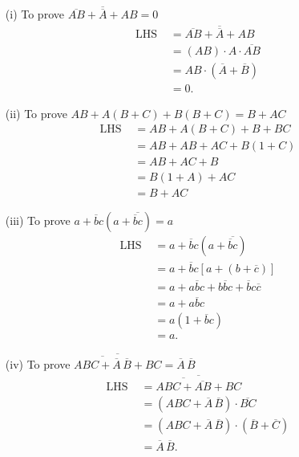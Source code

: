 \begin{solution}
\begin{itemize}
\item[(i)] To prove $\overline{\overline{AB}+\overline{A}+AB}=0$
\begin{align*}
\text{LHS } &= \overline{\overline{AB}+\overline{A}+AB}\\[3pt]
            &= (AB)\cdot A\cdot \overline{AB}\\[3pt]
            &= AB\cdot (\overline{A}+\overline{B})\\[3pt]
            &= 0. 
\end{align*}

\item[(ii)] To prove $AB+A(B+C)+B(B+C)=B+AC$
\begin{align*}
\text{LHS } &= AB+A(B+C)+B+BC\\[3pt]
 &= AB+AB+AC+B(1+C)\\[3pt]
 &= AB+AC+B\\[3pt]
 &= B(1+A)+AC\\[3pt]
 &= B+AC
\end{align*}

\item[(iii)] To prove $a+\overline{b}c(a+\overline{\overline{b}c})=a$
\begin{align*}
\text{LHS } &= a+\overline{b}c(a+\overline{\overline{b}c})\\[3pt]
            &= a+\overline{b}c[a+(b+\overline{c})]\\[3pt]
            &= a+a\overline{b}c+b\overline{b}c+\overline{b}c\overline{c}\\[3pt]
            &= a+a\overline{b}c\\[3pt]
            &= a(1+\overline{b}c)\\[3pt]
            &= a.
\end{align*}

\item[(iv)] To prove $\overline{\overline{ABC+\overline{A}\,\overline{B}}+BC}=\overline{A}\,\overline{B}$
\begin{align*}
\text{LHS } &= \overline{\overline{ABC+\overline{AB}}+BC}\\[3pt]
            &= (ABC+\overline{A}\,\overline{B})\cdot \overline{BC}\\[3pt]
            &= (ABC+\overline{A}\,\overline{B})\cdot (\overline{B}+\overline{C})\\[3pt]
            &= \overline{A}\,\overline{B}.
\end{align*}
\end{itemize}
\end{solution}

